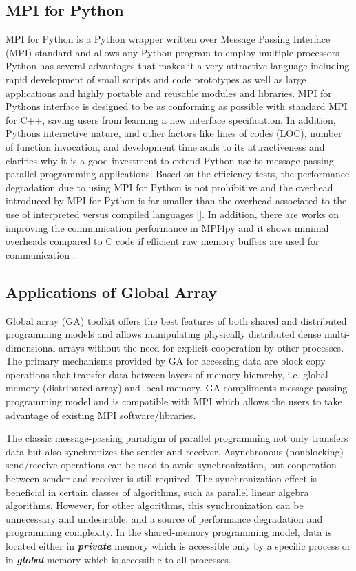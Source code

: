 \label{frameworks}

\subsection{MPI for Python}
MPI for Python is a Python wrapper written over Message Passing Interface (MPI) standard and allows any Python program to employ multiple processors \citep{Dalcin:2011aa, Dalcin:2005aa}.
Python has several advantages that makes it a very attractive language including rapid development of small scripts and code prototypes as well as large applications and highly portable and reusable modules and libraries.
MPI for Python\textquotesingle s interface is designed to be as conforming as possible with standard MPI for C++, saving users from learning a new interface specification. 
In addition, Python\textquotesingle s interactive nature, and other factors like lines of codes (LOC), number of function invocation, and development time adds to its attractiveness and clarifies why it is a good investment to extend Python use to message-passing parallel programming applications.
Based on the efficiency tests, the performance degradation due to using MPI for Python is not prohibitive and the overhead introduced by MPI for Python is far smaller than the overhead associated to the use of interpreted versus compiled languages [].
In addition, there are works on improving the communication performance in MPI4py and it shows minimal overheads compared to C code if efficient raw memory buffers are used for communication \citep{Dalcin:2011aa}.

\subsection{Applications of Global Array}
Global array (GA) toolkit offers the best features of both shared and distributed programming models and allows manipulating physically distributed dense multi-dimensional arrays without the need for explicit cooperation by other processes.
The primary mechanisms provided by GA for accessing data are block copy operations that transfer data between layers of memory hierarchy, i.e. global memory (distributed array) and local memory. 
GA compliments message passing programming model and is compatible with MPI which allows the users to take advantage of existing MPI software/libraries.

The classic message-passing paradigm of parallel programming not only transfers data but also synchronizes the sender and receiver. 
Asynchronous (nonblocking) send/receive operations can be used to avoid synchronization, but cooperation between sender and receiver is still required. 
The synchronization effect is beneficial in certain classes of algorithms, such as parallel linear algebra algorithms.
However, for other algorithms, this synchronization can be unnecessary and undesirable, and a source of performance degradation and programming complexity. 
In the shared-memory programming model, data is located either in \textbf{\textit{private}} memory which is accessible only by a specific process or in \textbf{\textit{global}} memory which is accessible to all processes. 

